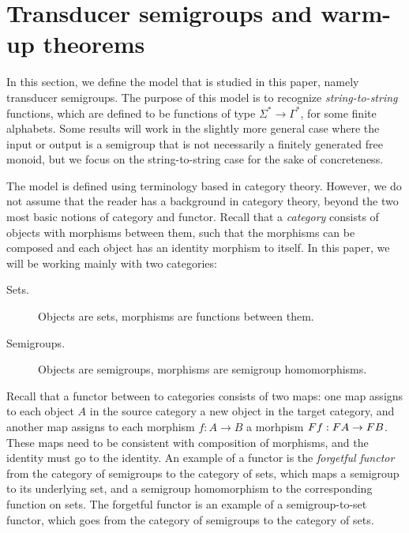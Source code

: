 \section{Transducer semigroups and warm-up theorems}\label{sec:warm-up}

In this section, we define the model that is studied in this paper, namely transducer semigroups. The purpose of this model is to recognize \emph{string-to-string} functions, which are defined to be functions of type $\Sigma^* \to \Gamma^*$, for some finite alphabets.  Some results will work in the slightly more general case where the input or output is a semigroup that is not necessarily a finitely generated free monoid, but we focus on the string-to-string case for the sake of concreteness.

The model is defined using terminology based in category theory. However,  we do not assume that the reader has a background in category theory, beyond the two most basic notions of category and functor. Recall that a \emph{category} consists of objects with morphisms between them, such that the morphisms can be composed and each object has an identity morphism to itself. In this paper, we will be working mainly with two categories:
\begin{description}
    \item[Sets.] Objects are sets,  morphisms are functions between them.
    \item[Semigroups.] Objects are semigroups,  morphisms are semigroup homomorphisms.
\end{description}
Recall that a functor between to categories consists of two maps: one map assigns to each object $A$ in the source category a new object in the target category, and another map assigns to each morphism $f : A \to B$ a morhpism $\functor f : \functor A \to \functor B$. These maps need to be consistent with composition of morphisms, and the identity must go to the identity. An example of a functor is the \emph{forgetful functor} from the category of semigroups to the category of sets, which maps a semigroup to its underlying set, and a semigroup homomorphism to the corresponding function on sets. The forgetful functor is an example of a semigroup-to-set functor, which goes from the category of semigroups to the category of sets. 

